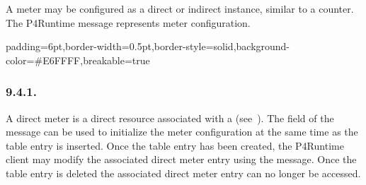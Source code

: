 \documentclass[11pt]{article}
\begin{document}
{%
A meter may be configured as a direct or indirect instance, similar to a
counter. The  P4Runtime message represents meter configuration.%

\begin{mdbmargintb}{6pt}{6pt}%
\begin{mdblock}{padding=6pt,border-width=0.5pt,border-style=solid,background-color=\#E6FFFF,breakable=true}%
\begin{mdpre}%
\end{mdpre}%
\end{mdblock}%
\end{mdbmargintb}%

\subsubsection{9.4.1.\hspace*{0.5em}}\label{sec-directmeterentry}%

\noindent{}A direct meter is a direct resource associated with a  (see~). The  field of the 
message can be used to initialize the meter configuration at the same time as
the table entry is inserted. Once the table entry has been created, the
P4Runtime client may modify the associated direct meter entry using the
 message. Once the table entry is deleted the associated
direct meter entry can no longer be accessed.%

}
\end{document}
